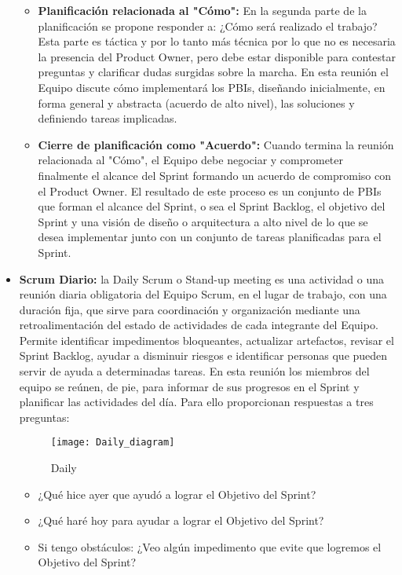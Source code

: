 \begin{itemize}
\begin{itemize}
\item \textbf{Planificación relacionada al "Cómo":} En la segunda parte de la planificación se propone responder a: ¿Cómo será realizado el trabajo? Esta parte es táctica y por lo tanto más técnica por lo que no es necesaria la presencia del Product Owner, pero debe estar disponible para contestar preguntas y clarificar dudas surgidas sobre la marcha. En esta reunión el Equipo discute cómo implementará los PBIs, diseñando inicialmente, en forma general y abstracta (acuerdo de alto nivel), las soluciones y definiendo tareas implicadas. 

\item \textbf{Cierre de planificación como "Acuerdo":} Cuando termina la reunión relacionada al "Cómo", el Equipo debe negociar y comprometer finalmente el alcance del Sprint formando un acuerdo de compromiso con el Product Owner. El resultado de este proceso es un conjunto de PBIs que forman el alcance del Sprint, o sea el Sprint Backlog, el objetivo del Sprint y una visión de diseño o arquitectura a alto nivel de lo que se desea implementar junto con un conjunto de tareas planificadas para el Sprint.

\end{itemize}

\item \textbf{Scrum Diario:} la Daily Scrum o Stand-up meeting es una actividad o una reunión diaria obligatoria del Equipo Scrum, en el lugar de trabajo, con una duración fija, que sirve para coordinación y organización mediante una retroalimentación del estado de actividades de cada integrante del Equipo. Permite identificar impedimentos bloqueantes, actualizar artefactos, revisar el Sprint Backlog, ayudar a disminuir riesgos e identificar personas que pueden servir de ayuda a determinadas tareas. En esta reunión los miembros del equipo se reúnen, de pie, para informar de sus progresos en el Sprint y planificar las actividades del día. Para ello proporcionan respuestas a tres preguntas:

\begin{figure}[h]
  \centering
  \texttt{[image: Daily\_diagram]}
  \caption{Daily}
  \centering
  \label{fig:Daily_diagram} %
\end{figure}
\FloatBarrier

\begin{itemize}
\item{¿Qué hice ayer que ayudó a lograr el Objetivo del Sprint?}
\item{¿Qué haré hoy para ayudar a lograr el Objetivo del Sprint?}
\item{Si tengo obstáculos: ¿Veo algún impedimento que evite que logremos el Objetivo del Sprint?}
\end{itemize}


\end{itemize}
